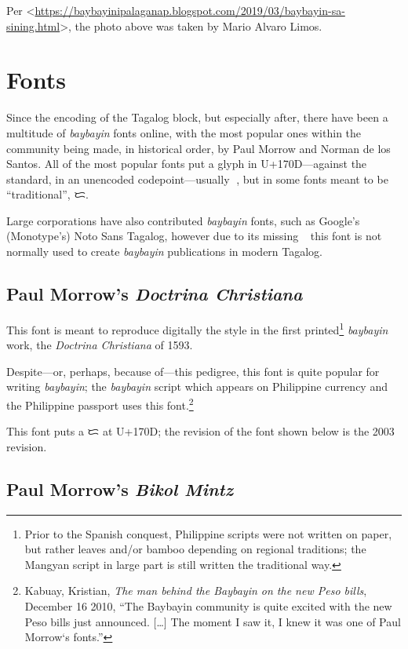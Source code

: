 \documentclass[a4paper,pagesize,openany,14pt,parskip=never]{scrbook}
\newcommand{\≈}{$\approx$}
\newcommand{\ra}{{\baybayin ᜍ}}
\begin{document}
Per <\url{https://baybayinipalaganap.blogspot.com/2019/03/baybayin-sa-sining.html}>, the photo above was taken by Mario Alvaro Limos.

\section{Fonts}
\label{Fonts}

Since the encoding of the Tagalog block, but especially after, there have been a multitude of {\em baybayin} fonts online, with the most popular ones within the community being made, in historical order, by Paul Morrow and Norman de los Santos. All of the most popular fonts put a glyph in U+170D---against the standard, in an unencoded codepoint---usually \ra, but in some fonts meant to be ``traditional'', {\baybayin ᜇ}.

Large corporations have also contributed {\em baybayin} fonts, such as Google's (Monotype's) Noto Sans Tagalog, however due to its missing \ra\ this font is not normally used to create {\em baybayin} publications in modern Tagalog.

\subsection{Paul Morrow's {\em Doctrina Christiana}}

This font is meant to reproduce digitally the style in the first printed\footnote{Prior to the Spanish conquest, Philippine scripts were not written on paper, but rather leaves and/or bamboo depending on regional traditions; the Mangyan script in large part is still written the traditional way.} {\em baybayin} work, the {\em Doctrina Christiana} of 1593.

Despite---or, perhaps, because of---this pedigree, this font is quite popular for writing {\em baybayin}; the {\em baybayin} script which appears on Philippine currency and the Philippine passport uses this font.\footnote{Kabuay, Kristian, {\em The man behind the Baybayin on the new Peso bills}, December 16 2010, ``The Baybayin community is quite excited with the new Peso bills just announced. [\ldots] The moment I saw it, I knew it was one of Paul Morrow‘s fonts.''}

This font puts a {\baybayin ᜇ} at U+170D; the revision of the font shown below is the 2003 revision.

\subsection{Paul Morrow's {\em Bikol Mintz}}
\end{document}
